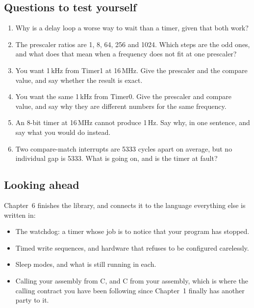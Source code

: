 \subsection*{Questions to test yourself}
\begin{enumerate}
  \item Why is a delay loop a worse way to wait than a timer, given that both work?
  \item The prescaler ratios are 1, 8, 64, 256 and 1024. Which steps are the odd ones, and what
    does that mean when a frequency does not fit at one prescaler?
  \item You want 1\,kHz from Timer1 at 16\,MHz. Give the prescaler and the compare value, and say
    whether the result is exact.
  \item You want the same 1\,kHz from Timer0. Give the prescaler and compare value, and say why
    they are different numbers for the same frequency.
  \item An 8-bit timer at 16\,MHz cannot produce 1\,Hz. Say why, in one sentence, and say what you
    would do instead.
  \item Two compare-match interrupts are 5333 cycles apart on average, but no individual gap is
    5333. What is going on, and is the timer at fault?
\end{enumerate}

\subsection*{Looking ahead}
Chapter~6 finishes the library, and connects it to the language everything else is written in:
\begin{itemize}
  \item The watchdog: a timer whose job is to notice that your program has stopped.
  \item Timed write sequences, and hardware that refuses to be configured carelessly.
  \item Sleep modes, and what is still running in each.
  \item Calling your assembly from C, and C from your assembly, which is where the calling contract
    you have been following since Chapter~1 finally has another party to it.
\end{itemize}
